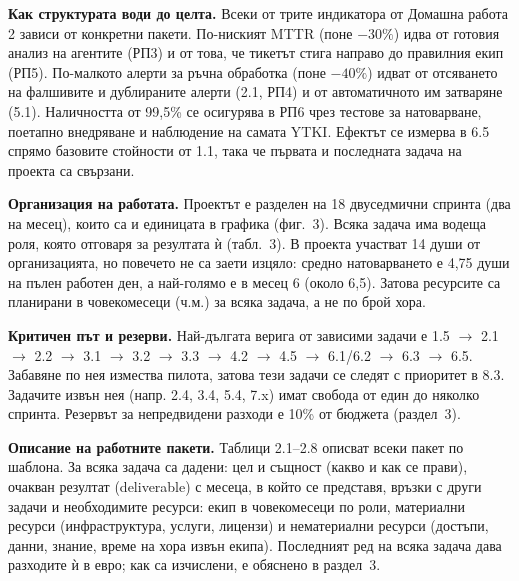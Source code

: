 \documentclass[11pt,a4paper]{article}
\begin{document}
\textbf{Как структурата води до целта.} Всеки от трите индикатора от Домашна работа 2 зависи от конкретни пакети. По-ниският MTTR (поне $-30\%$) идва от готовия анализ на агентите (РП3) и от това, че тикетът стига направо до правилния екип (РП5). По-малкото алерти за ръчна обработка (поне $-40\%$) идват от отсяването на фалшивите и дублираните алерти (2.1, РП4) и от автоматичното им затваряне (5.1). Наличността от 99,5\% се осигурява в РП6 чрез тестове за натоварване, поетапно внедряване и наблюдение на самата YTKI. Ефектът се измерва в 6.5 спрямо базовите стойности от 1.1, така че първата и последната задача на проекта са свързани.

\textbf{Организация на работата.} Проектът е разделен на 18 двуседмични спринта (два на месец), които са и единицата в графика (фиг.~3). Всяка задача има водеща роля, която отговаря за резултата ѝ (табл.~3). В проекта участват 14 души от организацията, но повечето не са заети изцяло: средно натоварването е 4,75 души на пълен работен ден, а най-голямо е в месец 6 (около 6,5). Затова ресурсите са планирани в човекомесеци (ч.м.) за всяка задача, а не по брой хора.

\textbf{Критичен път и резерви.} Най-дългата верига от зависими задачи е 1.5 $\rightarrow$ 2.1 $\rightarrow$ 2.2 $\rightarrow$ 3.1 $\rightarrow$ 3.2 $\rightarrow$ 3.3 $\rightarrow$ 4.2 $\rightarrow$ 4.5 $\rightarrow$ 6.1/6.2 $\rightarrow$ 6.3 $\rightarrow$ 6.5. Забавяне по нея измества пилота, затова тези задачи се следят с приоритет в 8.3. Задачите извън нея (напр. 2.4, 3.4, 5.4, 7.x) имат свобода от един до няколко спринта. Резервът за непредвидени разходи е 10\% от бюджета (раздел~3).

\textbf{Описание на работните пакети.} Таблици 2.1--2.8 описват всеки пакет по шаблона. За всяка задача са дадени: цел и същност (какво и как се прави), очакван резултат (deliverable) с месеца, в който се представя, връзки с други задачи и необходимите ресурси: екип в човекомесеци по роли, материални ресурси (инфраструктура, услуги, лицензи) и нематериални ресурси (достъпи, данни, знание, време на хора извън екипа). Последният ред на всяка задача дава разходите ѝ в евро; как са изчислени, е обяснено в раздел~3.
\end{document}
